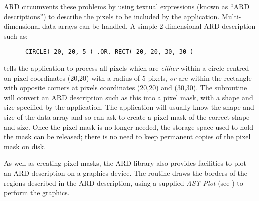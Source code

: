 ARD circumvents these problems by using textual expressions (known as ``ARD
descriptions'') to describe the pixels to be included by the application.
Multi-dimensional data arrays can be handled. A simple 2-dimensional ARD
description such as: 

\small
\begin{verbatim}
      CIRCLE( 20, 20, 5 ) .OR. RECT( 20, 20, 30, 30 ) 
\end{verbatim}
\normalsize

tells the application to process all pixels which are {\em either} within a
circle centred on pixel coordinates (20,20) with a radius of 5 pixels, 
{\em or} are within the rectangle with opposite corners at pixels coordinates 
(20,20) and (30,30). The 
subroutine will convert an ARD description such as this into a pixel mask, with
a shape and size specified by the application. The application will usually know
the shape and size of the data array and so can ask  to create a pixel
mask of the correct shape and size. Once the pixel mask is no longer needed,
the storage space used to hold the mask can be released; there is no need to
keep permanent copies of the pixel mask on disk. 

As well as creating pixel masks, the ARD library also provides facilities
to plot an ARD description on a graphics device. The  
routine draws the borders of the regions described in the ARD description, 
using a supplied {\em AST Plot} (see ) to perform
the graphics.

